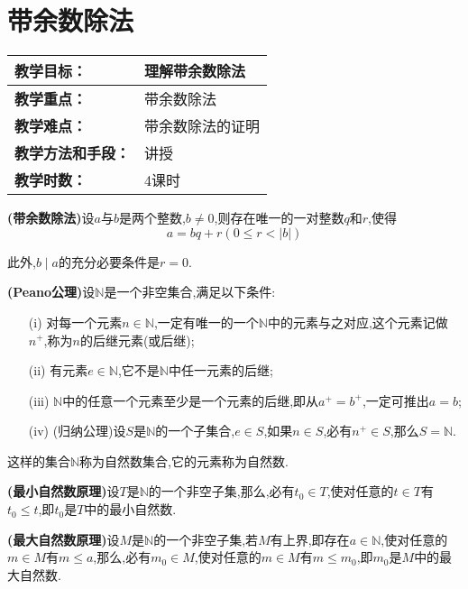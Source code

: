 \section{带余数除法}
\begin{table}[htb]
	\centering  
	\begin{tabular}{p{32mm}|p{95.6mm}}
		\hline 
		\textbf{教学目标：}       & 理解带余数除法  \\ \hline
		\textbf{教学重点：}       & 带余数除法 \\ \hline
		\textbf{教学难点：}       & 带余数除法的证明\\ \hline
		\textbf{教学方法和手段：} & 讲授  \\ \hline
		\textbf{教学时数：}       & 4课时 \\ \hline
	\end{tabular}
\end{table}
\theorem \textbf{(带余数除法)}设$a$与$b$是两个整数,$b\neq 0$,则存在唯一的一对整数$q$和$r$,使得
\begin{equation}\label{equ1.1}
	a=bq+r(0\leqslant r<|b|)
\end{equation}

此外,$b\mid a$的充分必要条件是$r=0$.

\theorem \textbf{(Peano公理)}设$\mathbb{N}$是一个非空集合,满足以下条件:
\begin{enumerate}[itemindent=2em]
	\item[(i)] 对每一个元素$n\in\mathbb{N}$,一定有唯一的一个$\mathbb{N}$中的元素与之对应,这个元素记做$n^{+}$,称为$n$的后继元素(或后继);
	\item[(ii)] 有元素$e\in\mathbb{N}$,它不是$\mathbb{N}$中任一元素的后继;
	\item[(iii)] $\mathbb{N}$中的任意一个元素至少是一个元素的后继,即从$a^{+}=b^{+}$,一定可推出$a=b$;
	\item[(iv)] (归纳公理)设$S$是$\mathbb{N}$的一个子集合,$e\in S$,如果$n\in S$,必有$n^{+}\in S$,那么$S=\mathbb{N}$.
\end{enumerate}
这样的集合$\mathbb{N}$称为自然数集合,它的元素称为自然数.

\theorem \textbf{(最小自然数原理)}设$T$是$\mathbb{N}$的一个非空子集,那么,必有$t_{0}\in T$,使对任意的$t\in T$有$t_{0}\leqslant t$,即$t_{0}$是$T$中的最小自然数.

\theorem \textbf{(最大自然数原理)}设$M$是$\mathbb{N}$的一个非空子集,若$M$有上界,即存在$a\in\mathbb{N}$,使对任意的$m\in M$有$m\leqslant a$,那么,必有$m_{0}\in M$,使对任意的$m\in M$有$m\leqslant m_{0}$,即$m_{0}$是$M$中的最大自然数.

